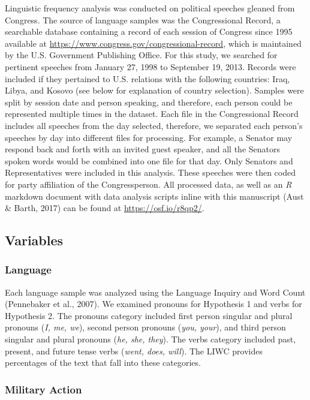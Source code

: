 \documentclass[english,man]{apa6}
\theoremstyle{definition}
\theoremstyle{definition}
\theoremstyle{definition}
\theoremstyle{remark}
\begin{document}
Linguistic frequency analysis was conducted on political speeches
gleaned from Congress. The source of language samples was the
Congressional Record, a searchable database containing a record of each
session of Congress since 1995 available at
\url{https://www.congress.gov/congressional-record}, which is maintained
by the U.S. Government Publishing Office. For this study, we searched
for pertinent speeches from January 27, 1998 to September 19, 2013.
Records were included if they pertained to U.S. relations with the
following countries: Iraq, Libya, and Kosovo (see below for explanation
of country selection). Samples were split by session date and person
speaking, and therefore, each person could be represented multiple times
in the dataset. Each file in the Congressional Record includes all
speeches from the day selected, therefore, we separated each person's
speeches by day into different files for processing. For example, a
Senator may respond back and forth with an invited guest speaker, and
all the Senators spoken words would be combined into one file for that
day. Only Senators and Representatives were included in this analysis.
These speeches were then coded for party affiliation of the
Congressperson. All processed data, as well as an \emph{R} markdown
document with data analysis scripts inline with this manuscript (Aust \&
Barth, 2017) can be found at \url{https://osf.io/r8qp2/}.

\subsection{Variables}\label{variables}

\subsubsection{Language}\label{language}

Each language sample was analyzed using the Language Inquiry and Word
Count (Pennebaker et al., 2007). We examined pronouns for Hypothesis 1
and verbs for Hypothesis 2. The pronouns category included first person
singular and plural pronouns (\emph{I, me, we}), second person pronouns
(\emph{you, your}), and third person singular and plural pronouns
(\emph{he, she, they}). The verbs category included past, present, and
future tense verbs (\emph{went, does, will}). The LIWC provides
percentages of the text that fall into these categories.

\subsubsection{Military Action}\label{military-action}
\end{document}
